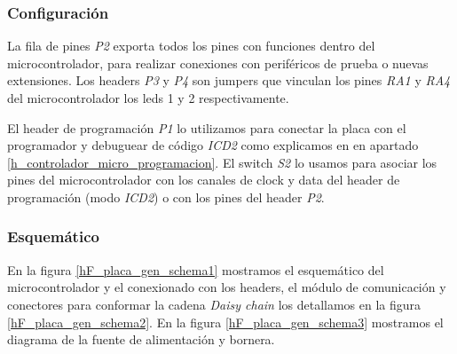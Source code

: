 \subsubsection{Configuraci\'on}
\label{h_placas_generica_config}

La fila de pines \emph{P2} exporta todos los pines con funciones dentro del microcontrolador, para realizar
conexiones con perif\'ericos de prueba o nuevas extensiones.
Los headers \emph{P3} y \emph{P4} son jumpers que vinculan los pines \emph{RA1} y \emph{RA4} del
microcontrolador los leds 1 y 2 respectivamente.

El header de programaci\'on \emph{P1} lo utilizamos para conectar la placa con el programador y debuguear
de c\'odigo \emph{ICD2} como explicamos en en apartado \ref{h_controlador_micro_programacion}.
El switch \emph{S2} lo usamos para asociar los pines del microcontrolador con los canales de clock
y data del header de programaci\'on (modo \emph{ICD2}) o con los pines del header \emph{P2}.

\subsubsection{Esquem\'atico}
\label{h_placas_generica_esquematicos}

En la figura \ref{hF_placa_gen_schema1} mostramos el esquem\'atico del microcontrolador y el conexionado
con los headers, el m\'odulo de comunicaci\'on y conectores para conformar la cadena \emph{Daisy chain}
los detallamos en la figura \ref{hF_placa_gen_schema2}.
En la figura \ref{hF_placa_gen_schema3} mostramos el diagrama de la fuente de alimentaci\'on y bornera.


